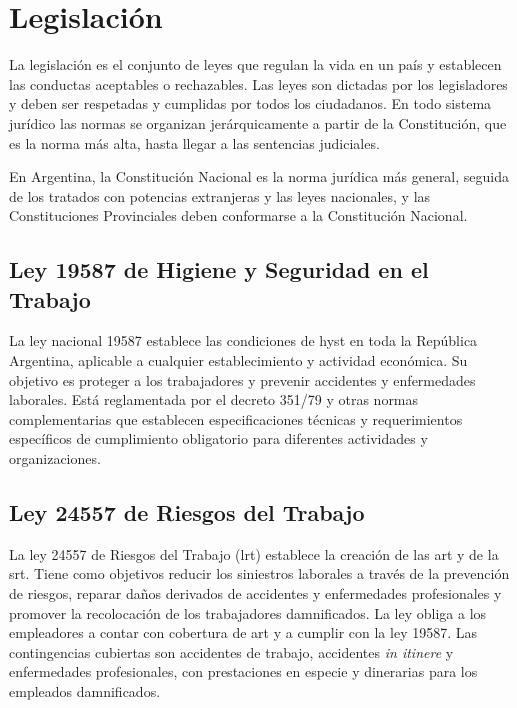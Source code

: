 \section{Legislación}

La legislación es el conjunto de leyes que regulan la vida en un país y 
establecen las conductas aceptables o rechazables. Las leyes son dictadas por 
los legisladores y deben ser respetadas y cumplidas por todos los ciudadanos. 
En todo sistema jurídico las normas se organizan jerárquicamente a partir de la
Constitución, que es la norma más alta, hasta llegar a las sentencias 
judiciales. 

En Argentina, la Constitución Nacional es la norma jurídica más general, seguida
de los tratados con potencias extranjeras y las leyes nacionales, y las 
Constituciones Provinciales deben conformarse a la Constitución Nacional.

\subsection{Ley 19587 de Higiene y Seguridad en el Trabajo}

La ley nacional 19587 establece las condiciones de \acrshort{hyst} en toda la 
República Argentina, aplicable a cualquier establecimiento y actividad 
económica. Su objetivo es proteger a los trabajadores y prevenir accidentes y 
enfermedades laborales. Está reglamentada por el decreto 351/79 y otras normas 
complementarias que establecen especificaciones técnicas y requerimientos 
específicos de cumplimiento obligatorio para diferentes actividades y 
organizaciones.

\subsection{Ley 24557 de Riesgos del Trabajo}

La ley 24557 de Riesgos del Trabajo (\acrshort{lrt}) establece la creación de 
las \acrfull{art} 
y de la \acrshort{srt}. Tiene como objetivos reducir los siniestros laborales a
través de la prevención de riesgos, reparar daños derivados de accidentes y 
enfermedades profesionales y promover la recolocación de los trabajadores 
damnificados. La ley obliga a los empleadores a contar con cobertura de 
\acrshort{art} y a cumplir con la ley 19587. Las contingencias cubiertas son 
accidentes de trabajo, accidentes \textit{in itinere} y enfermedades 
profesionales, con prestaciones en especie y dinerarias para los empleados 
damnificados.

